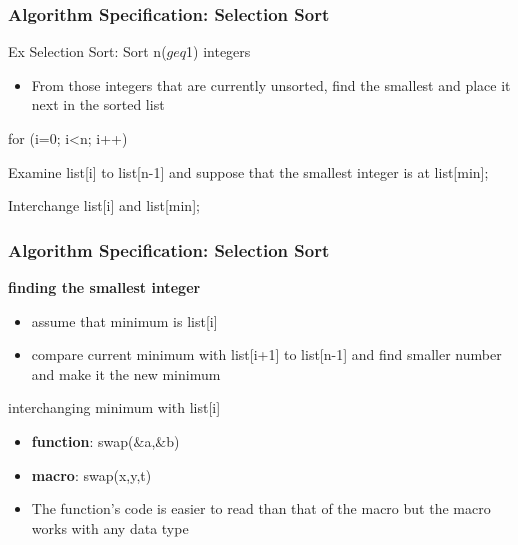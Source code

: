 \documentclass[newPxFont,sthlmFooter,nooffset]{beamer}
\begin{document}
\begin{frame}[t,fragile]
  \frametitle{Algorithm Specification: Selection Sort}
Ex Selection Sort: Sort n($geq$1) integers
\begin{itemize}
\item From those integers that are currently unsorted, find the smallest and place it next in the sorted list
\end{itemize}

\begin{codedef}
for (i=0; i<n; i++) {
    Examine list[i] to list[n-1] and suppose 
    that the smallest integer is at list[min];
  
    Interchange list[i] and list[min];
}
\end{codedef}

\end{frame}

\begin{frame}[t,fragile]
  \frametitle{Algorithm Specification: Selection Sort}

\textbf{finding the smallest integer}
\begin{itemize}
\item assume that minimum is list[i]
\item compare current minimum with list[i+1] to list[n-1] and find
  smaller number and make it the new minimum 
\end{itemize}

interchanging minimum with list[i]

\begin{itemize}
	\item\textbf{function}: swap($\&$a,$\&$b)
\end{itemize}

\begin{itemize}
	\item\textbf{macro}: swap(x,y,t)
\end{itemize}

\begin{itemize}
	\item The function's code is easier to read than that of the macro but the macro works with any data type
\end{itemize}

\end{frame}
\end{document}
